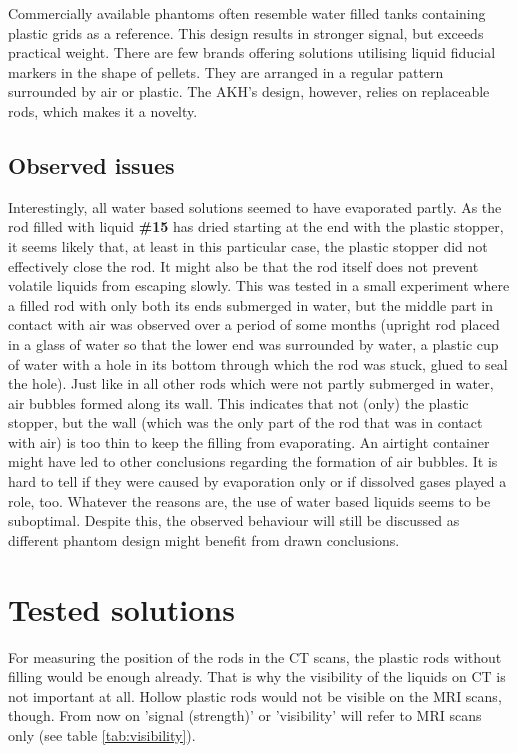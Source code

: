 Commercially available phantoms often resemble water filled tanks containing plastic grids as a reference.
This design results in stronger signal, but exceeds practical weight.
There are few brands offering solutions utilising liquid fiducial markers in the shape of pellets.
They are arranged in a regular pattern surrounded by air or plastic.
The AKH's design, however, relies on replaceable rods, which makes it a novelty.

\subsection{Observed issues}

Interestingly, all water based solutions seemed to have evaporated partly.
As the rod filled with liquid \textbf{\#15} has dried starting at the end with the plastic stopper, it seems likely that, at least in this particular case, the plastic stopper did not effectively close the rod.
It might also be that the rod itself does not prevent volatile liquids from escaping slowly.
This was tested in a small experiment where a filled rod with only both its ends submerged in water, but the middle part in contact with air was observed over a period of some months (upright rod placed in a glass of water so that the lower end was surrounded by water, a plastic cup of water with a hole in its bottom through which the rod was stuck, glued to seal the hole).
Just like in all other rods which were not partly submerged in water, air bubbles formed along its wall.
This indicates that not (only) the plastic stopper, but the wall (which was the only part of the rod that was in contact with air) is too thin to keep the filling from evaporating.
An airtight container might have led to other conclusions regarding the formation of air bubbles.
It is hard to tell if they were caused by evaporation only or if dissolved gases played a role, too.
Whatever the reasons are, the use of water based liquids seems to be suboptimal.
Despite this, the observed behaviour will still be discussed as different phantom design might benefit from drawn conclusions.

\section{Tested solutions}

For measuring the position of the rods in the CT scans, the plastic rods without filling would be enough already.
That is why the visibility of the liquids on CT is not important at all.
Hollow plastic rods would not be visible on the MRI scans, though.
From now on 'signal (strength)' or 'visibility' will refer to MRI scans only (see table \ref{tab:visibility}).

